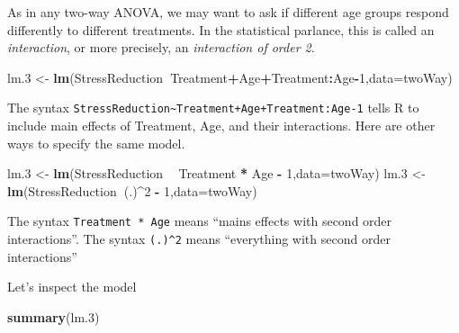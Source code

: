 \documentclass[]{book}
\newenvironment{Shaded}{\begin{snugshade}}{\end{snugshade}}
\newcommand{\KeywordTok}[1]{\textcolor[rgb]{0.13,0.29,0.53}{\textbf{#1}}}
\newcommand{\DataTypeTok}[1]{\textcolor[rgb]{0.13,0.29,0.53}{#1}}
\newcommand{\DecValTok}[1]{\textcolor[rgb]{0.00,0.00,0.81}{#1}}
\newcommand{\StringTok}[1]{\textcolor[rgb]{0.31,0.60,0.02}{#1}}
\newcommand{\OperatorTok}[1]{\textcolor[rgb]{0.81,0.36,0.00}{\textbf{#1}}}
\newcommand{\NormalTok}[1]{#1}
\theoremstyle{definition}
\theoremstyle{definition}
\theoremstyle{definition}
\theoremstyle{remark}
\begin{document}
As in any two-way ANOVA, we may want to ask if different age groups
respond differently to different treatments. In the statistical
parlance, this is called an \emph{interaction}, or more precisely, an
\emph{interaction of order 2}.

\begin{Shaded}
\begin{Highlighting}[]
\NormalTok{lm.}\DecValTok{3}\NormalTok{ <-}\StringTok{ }\KeywordTok{lm}\NormalTok{(StressReduction}\OperatorTok{~}\NormalTok{Treatment}\OperatorTok{+}\NormalTok{Age}\OperatorTok{+}\NormalTok{Treatment}\OperatorTok{:}\NormalTok{Age}\OperatorTok{-}\DecValTok{1}\NormalTok{,}\DataTypeTok{data=}\NormalTok{twoWay)}
\end{Highlighting}
\end{Shaded}

The syntax
\texttt{StressReduction\textasciitilde{}Treatment+Age+Treatment:Age-1}
tells R to include main effects of Treatment, Age, and their
interactions. Here are other ways to specify the same model.

\begin{Shaded}
\begin{Highlighting}[]
\NormalTok{lm.}\DecValTok{3}\NormalTok{ <-}\StringTok{ }\KeywordTok{lm}\NormalTok{(StressReduction }\OperatorTok{~}\StringTok{ }\NormalTok{Treatment }\OperatorTok{*}\StringTok{ }\NormalTok{Age }\OperatorTok{-}\StringTok{ }\DecValTok{1}\NormalTok{,}\DataTypeTok{data=}\NormalTok{twoWay)}
\NormalTok{lm.}\DecValTok{3}\NormalTok{ <-}\StringTok{ }\KeywordTok{lm}\NormalTok{(StressReduction}\OperatorTok{~}\NormalTok{(.)}\OperatorTok{^}\DecValTok{2} \OperatorTok{-}\StringTok{ }\DecValTok{1}\NormalTok{,}\DataTypeTok{data=}\NormalTok{twoWay)}
\end{Highlighting}
\end{Shaded}

The syntax \texttt{Treatment\ *\ Age} means ``mains effects with second
order interactions''. The syntax \texttt{(.)\^{}2} means ``everything
with second order interactions''

Let's inspect the model

\begin{Shaded}
\begin{Highlighting}[]
\KeywordTok{summary}\NormalTok{(lm.}\DecValTok{3}\NormalTok{)}
\end{Highlighting}
\end{Shaded}
\end{document}
